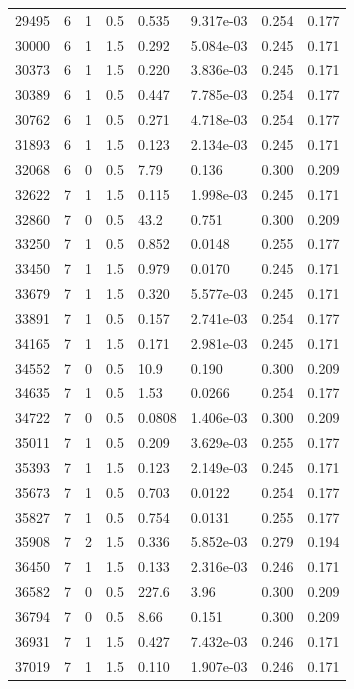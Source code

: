 \documentclass[preview]{standalone}
\begin{document}
{{{\begin{tabular}{L{1.2cm}C{1.2cm} C{0.3cm}C{0.5cm} C{1.4cm}C{1.4cm} C{1.4cm}C{1.4cm}}
  29495  &     6  & 1     & 0.5 &  0.535  & 9.317e-03  & 0.254 &  0.177   \\ 
  30000  &     6  & 1     & 1.5 &  0.292  & 5.084e-03  & 0.245 &  0.171   \\ 
  30373  &     6  & 1     & 1.5 &  0.220  & 3.836e-03  & 0.245 &  0.171   \\ 
  30389  &     6  & 1     & 0.5 &  0.447  & 7.785e-03  & 0.254 &  0.177   \\ 
  30762  &     6  & 1     & 0.5 &  0.271  & 4.718e-03  & 0.254 &  0.177   \\ 
  31893  &     6  & 1     & 1.5 &  0.123  & 2.134e-03  & 0.245 &  0.171   \\ 
  32068  &     6  & 0     & 0.5 &  7.79  & 0.136  & 0.300 &  0.209   \\ 
  32622  &     7  & 1     & 1.5 &  0.115  & 1.998e-03  & 0.245 &  0.171   \\ 
  32860  &     7  & 0     & 0.5 &  43.2  & 0.751  & 0.300 &  0.209   \\ 
  33250  &     7  & 1     & 0.5 &  0.852  & 0.0148  & 0.255 &  0.177   \\ 
  33450  &     7  & 1     & 1.5 &  0.979  & 0.0170  & 0.245 &  0.171   \\ 
  33679  &     7  & 1     & 1.5 &  0.320  & 5.577e-03  & 0.245 &  0.171   \\ 
  33891  &     7  & 1     & 0.5 &  0.157  & 2.741e-03  & 0.254 &  0.177   \\ 
  34165  &     7  & 1     & 1.5 &  0.171  & 2.981e-03  & 0.245 &  0.171   \\ 
  34552  &     7  & 0     & 0.5 &  10.9  & 0.190  & 0.300 &  0.209   \\ 
  34635  &     7  & 1     & 0.5 &  1.53  & 0.0266  & 0.254 &  0.177   \\ 
  34722  &     7  & 0     & 0.5 &  0.0808  & 1.406e-03  & 0.300 &  0.209   \\ 
  35011  &     7  & 1     & 0.5 &  0.209  & 3.629e-03  & 0.255 &  0.177   \\ 
  35393  &     7  & 1     & 1.5 &  0.123  & 2.149e-03  & 0.245 &  0.171   \\ 
  35673  &     7  & 1     & 0.5 &  0.703  & 0.0122  & 0.254 &  0.177   \\ 
  35827  &     7  & 1     & 0.5 &  0.754  & 0.0131  & 0.255 &  0.177   \\ 
  35908  &     7  & 2     & 1.5 &  0.336  & 5.852e-03  & 0.279 &  0.194   \\ 
  36450  &     7  & 1     & 1.5 &  0.133  & 2.316e-03  & 0.246 &  0.171   \\ 
  36582  &     7  & 0     & 0.5 &  227.6  & 3.96  & 0.300 &  0.209   \\ 
  36794  &     7  & 0     & 0.5 &  8.66  & 0.151  & 0.300 &  0.209   \\ 
  36931  &     7  & 1     & 1.5 &  0.427  & 7.432e-03  & 0.246 &  0.171   \\ 
  37019  &     7  & 1     & 1.5 &  0.110  & 1.907e-03  & 0.246 &  0.171   \\ 
\hline 
\end{tabular} 

}}}
\end{document}
